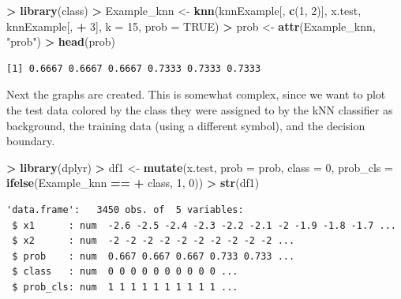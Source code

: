 \documentclass[]{krantz}
\makeatletter
\newenvironment{Shaded}{\begin{snugshade}}{\end{snugshade}}
\newcommand{\DataTypeTok}[1]{\textcolor[rgb]{0.27,0.27,0.27}{#1}}
\newcommand{\DecValTok}[1]{\textcolor[rgb]{0.06,0.06,0.06}{#1}}
\newcommand{\KeywordTok}[1]{\textcolor[rgb]{0.27,0.27,0.27}{\textbf{#1}}}
\newcommand{\NormalTok}[1]{#1}
\newcommand{\OperatorTok}[1]{\textcolor[rgb]{0.43,0.43,0.43}{\textbf{#1}}}
\newcommand{\OtherTok}[1]{\textcolor[rgb]{0.37,0.37,0.37}{#1}}
\newcommand{\StringTok}[1]{\textcolor[rgb]{0.5,0.5,0.5}{#1}}
\newenvironment{kframe}{%
\medskip{}
\setlength{\fboxsep}{.8em}
 \def\at@end@of@kframe{}%
 \ifinner\ifhmode%
  \def\at@end@of@kframe{\end{minipage}}%
  \begin{minipage}{\columnwidth}%
 \fi\fi%
 \def\FrameCommand##1{\hskip\@totalleftmargin \hskip-\fboxsep
 \colorbox{shadecolor}{##1}\hskip-\fboxsep
     \hskip-\linewidth \hskip-\@totalleftmargin \hskip\columnwidth}%
 \MakeFramed {\advance\hsize-\width
   \@totalleftmargin\z@ \linewidth\hsize
   \@setminipage}}%
 {\par\unskip\endMakeFramed%
 \at@end@of@kframe}
\renewenvironment{Shaded}{\begin{kframe}}{\end{kframe}}
\makeatother
\begin{document}
\begin{Shaded}
\begin{Highlighting}[]
\OperatorTok{>}\StringTok{ }\KeywordTok{library}\NormalTok{(class)}
\OperatorTok{>}\StringTok{ }\NormalTok{Example_knn <-}\StringTok{ }\KeywordTok{knn}\NormalTok{(knnExample[, }\KeywordTok{c}\NormalTok{(}\DecValTok{1}\NormalTok{, }\DecValTok{2}\NormalTok{)], x.test, knnExample[, }
\OperatorTok{+}\StringTok{   }\DecValTok{3}\NormalTok{], }\DataTypeTok{k =} \DecValTok{15}\NormalTok{, }\DataTypeTok{prob =} \OtherTok{TRUE}\NormalTok{)}
\OperatorTok{>}\StringTok{ }\NormalTok{prob <-}\StringTok{ }\KeywordTok{attr}\NormalTok{(Example_knn, }\StringTok{"prob"}\NormalTok{)}
\OperatorTok{>}\StringTok{ }\KeywordTok{head}\NormalTok{(prob)}
\end{Highlighting}
\end{Shaded}

\begin{verbatim}
[1] 0.6667 0.6667 0.6667 0.7333 0.7333 0.7333
\end{verbatim}

Next the graphs are created. This is somewhat complex, since we want to plot the test data colored by the class they were assigned to by the kNN classifier as background, the training data (using a different symbol), and the decision boundary.

\begin{Shaded}
\begin{Highlighting}[]
\OperatorTok{>}\StringTok{ }\KeywordTok{library}\NormalTok{(dplyr)}
\OperatorTok{>}\StringTok{ }\NormalTok{df1 <-}\StringTok{ }\KeywordTok{mutate}\NormalTok{(x.test, }\DataTypeTok{prob =}\NormalTok{ prob, }\DataTypeTok{class =} \DecValTok{0}\NormalTok{, }\DataTypeTok{prob_cls =} \KeywordTok{ifelse}\NormalTok{(Example_knn }\OperatorTok{==}\StringTok{ }
\OperatorTok{+}\StringTok{   }\NormalTok{class, }\DecValTok{1}\NormalTok{, }\DecValTok{0}\NormalTok{))}
\OperatorTok{>}\StringTok{ }\KeywordTok{str}\NormalTok{(df1)}
\end{Highlighting}
\end{Shaded}

\begin{verbatim}
'data.frame':   3450 obs. of  5 variables:
 $ x1      : num  -2.6 -2.5 -2.4 -2.3 -2.2 -2.1 -2 -1.9 -1.8 -1.7 ...
 $ x2      : num  -2 -2 -2 -2 -2 -2 -2 -2 -2 -2 ...
 $ prob    : num  0.667 0.667 0.667 0.733 0.733 ...
 $ class   : num  0 0 0 0 0 0 0 0 0 0 ...
 $ prob_cls: num  1 1 1 1 1 1 1 1 1 1 ...
\end{verbatim}
\end{document}
